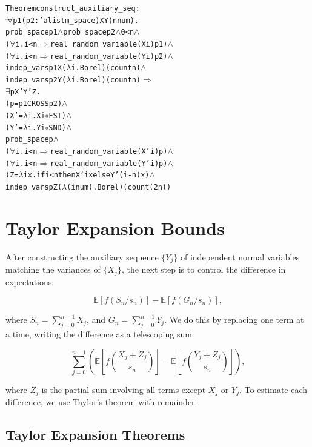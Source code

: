 \begin{hol}
  \begin{alltt}
    Theorem construct\_auxiliary\_seq :
    \(\!\!\!{\turn}\!\!\!\!\) \(\forall\)p1 (p2 :'a list m\_space) X Y (n \:num).
    prob\_space p1 \(\land\) prob\_space p2 \(\land\) 0 < n \(\land\)
    (\(\forall\)i. i < n \(\Rightarrow\) real\_random\_variable (X i) p1) \(\land\)
    (\(\forall\)i. i < n \(\Rightarrow\) real\_random\_variable (Y i) p2) \(\land\)
    indep\_vars p1 X (\(\lambda\)i. Borel) (count n) \(\land\)
    indep\_vars p2 Y (\(\lambda\)i. Borel) (count n) \(\Rightarrow\)
    \(\exists\)p X' Y' Z.
    (p = p1 CROSS p2) \(\land\)
    (X' = \(\lambda\)i. X i \(\circ\) FST) \(\land\)
    (Y' = \(\lambda\)i. Y i \(\circ\) SND) \(\land\)
    prob\_space p \(\land\)
    (\(\forall\)i. i < n \(\Rightarrow\) real\_random\_variable (X' i) p) \(\land\)
    (\(\forall\)i. i < n \(\Rightarrow\) real\_random\_variable (Y' i) p) \(\land\)
    (Z = \(\lambda\)i x. if i < n then X' i x else Y' (i - n) x) \(\land\)
    indep\_vars p Z (\(\lambda\)(i \:num). Borel) (count (2 \* n))
  \end{alltt}
\end{hol}

\section {Taylor Expansion Bounds}

After constructing the auxiliary sequence $\{Y_j\}$ of independent normal variables matching the variances of $\{X_j\}$, the next step is to control the difference in expectations:

\[
\mathbb{E}[f(S_n / s_n)] - \mathbb{E}[f(G_n / s_n)],
\]

where $S_n = \sum_{j=0}^{n-1} X_j$, and $G_n = \sum_{j=0}^{n-1} Y_j$. We do this by replacing one term at a time, writing the difference as a telescoping sum:

\[
\sum_{j=0}^{n-1} \left(
\mathbb{E}\left[f\left(\frac{X_j + Z_j}{s_n}\right)\right]
-
\mathbb{E}\left[f\left(\frac{Y_j + Z_j}{s_n}\right)\right]
\right),
\]

where $Z_j$ is the partial sum involving all terms except $X_j$ or $Y_j$.
To estimate each difference, we use Taylor's theorem with remainder.


\subsection{Taylor Expansion Theorems}

